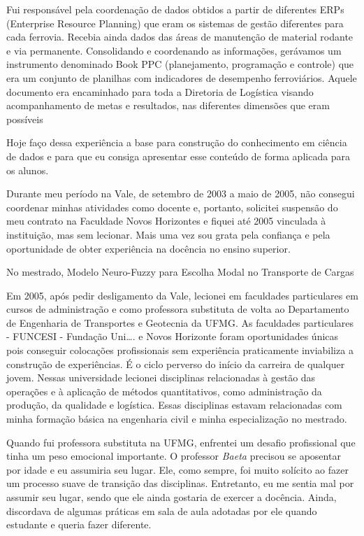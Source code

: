 \documentclass[
]{book}
\begin{document}
Fui responsável pela coordenação de dados obtidos a partir de diferentes ERPs (Enterprise Resource Planning) que eram os sistemas de gestão diferentes para cada ferrovia. Recebia ainda dados das áreas de manutenção de material rodante e via permanente. Consolidando e coordenando as informações, gerávamos um instrumento denominado Book PPC (planejamento, programação e controle) que era um conjunto de planilhas com indicadores de desempenho ferroviários. Aquele documento era encaminhado para toda a Diretoria de Logística visando acompanhamento de metas e resultados, nas diferentes dimensões que eram possíveis

Hoje faço dessa experiência a base para construção do conhecimento em ciência de dados e para que eu consiga apresentar esse conteúdo de forma aplicada para os alunos.

Durante meu período na Vale, de setembro de 2003 a maio de 2005, não consegui coordenar minhas atividades como docente e, portanto, solicitei suspensão do meu contrato na Faculdade Novos Horizontes e fiquei até 2005 vinculada à instituição, mas sem lecionar. Mais uma vez sou grata pela confiança e pela oportunidade de obter experiência na docência no ensino superior.

No mestrado, Modelo Neuro-Fuzzy para Escolha Modal no Transporte de Cargas

Em 2005, após pedir desligamento da Vale, lecionei em faculdades particulares em cursos de administração e como professora substituta de volta ao Departamento de Engenharia de Transportes e Geotecnia da UFMG. As faculdades particulares - FUNCESI - Fundação Uni\ldots. e Novos Horizonte foram oportunidades únicas pois conseguir colocações profissionais sem experiência praticamente inviabiliza a construção de experiências. É o ciclo perverso do início da carreira de qualquer jovem. Nessas universidade lecionei disciplinas relacionadas à gestão das operações e à aplicação de métodos quantitativos, como administração da produção, da qualidade e logística. Essas disciplinas estavam relacionadas com minha formação básica na engenharia civil e minha especialização no mestrado.

Quando fui professora substituta na UFMG, enfrentei um desafio profissional que tinha um peso emocional importante. O professor \emph{Baeta} precisou se aposentar por idade e eu assumiria seu lugar. Ele, como sempre, foi muito solícito ao fazer um processo suave de transição das disciplinas. Entretanto, eu me sentia mal por assumir seu lugar, sendo que ele ainda gostaria de exercer a docência. Ainda, discordava de algumas práticas em sala de aula adotadas por ele quando estudante e queria fazer diferente.
\end{document}
